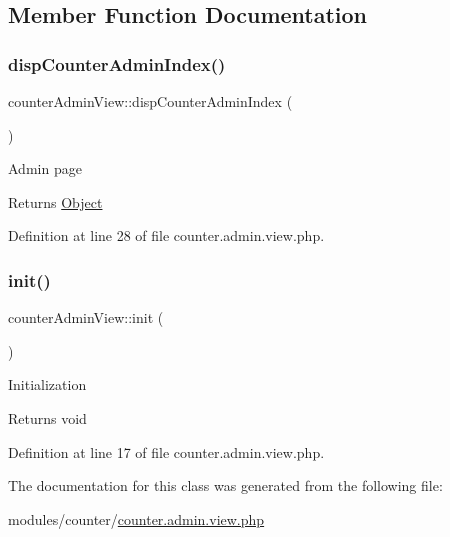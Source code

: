 \subsection{Member Function Documentation}
\hypertarget{classcounterAdminView_a029f646bdb62ed58543428face01dfd9}{}\label{classcounterAdminView_a029f646bdb62ed58543428face01dfd9} 
\subsubsection{\texorpdfstring{disp\+Counter\+Admin\+Index()}{dispCounterAdminIndex()}}
{\footnotesize\ttfamily counter\+Admin\+View\+::disp\+Counter\+Admin\+Index (\begin{DoxyParamCaption}{ }\end{DoxyParamCaption})}

Admin page

\begin{DoxyReturn}{Returns}
\hyperlink{classObject}{Object} 
\end{DoxyReturn}


Definition at line 28 of file counter.\+admin.\+view.\+php.

\hypertarget{classcounterAdminView_af681921cbd5c264feb82469ae49195af}{}\label{classcounterAdminView_af681921cbd5c264feb82469ae49195af} 
\subsubsection{\texorpdfstring{init()}{init()}}
{\footnotesize\ttfamily counter\+Admin\+View\+::init (\begin{DoxyParamCaption}{ }\end{DoxyParamCaption})}

Initialization

\begin{DoxyReturn}{Returns}
void 
\end{DoxyReturn}


Definition at line 17 of file counter.\+admin.\+view.\+php.



The documentation for this class was generated from the following file\+:\begin{DoxyCompactItemize}
\item 
modules/counter/\hyperlink{counter_8admin_8view_8php}{counter.\+admin.\+view.\+php}\end{DoxyCompactItemize}
